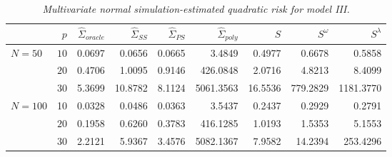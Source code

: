 %
%
\begin{table}[H]
\centering
\caption{\textit{Multivariate normal simulation-estimated quadratic risk  for model III.} }
\begin{tabular}{lrrrrrrrr}
  & $p$ &$\hat{\Sigma}_{oracle}$& $\hat{\Sigma}_{SS}$& $\hat{\Sigma}_{PS}$ & $\hat{\Sigma}_{poly}$ & $S$ &$S^\omega$& $S^\lambda$ \\ 
  \hline
$N = 50$ & $10$ & 0.0697 &0.0656 & 0.0665 &  3.4849 & 0.4977 & 0.6678 & 0.5858 \\ 
    &    $20$ & 0.4706 &1.0095 & 0.9146 &  426.0848 & 2.0716 & 4.8213 & 8.4099 \\ 
    &    $30$ & 5.3699 & 10.8782 & 8.1124 &  5061.3563 & 16.5536 & 779.2829 & 1181.3770 \\ 
     $N = 100$ & 10 & 0.0328 & 0.0486 & 0.0363 &  3.5437 & 0.2437 & 0.2929 & 0.2791 \\ 
     & $20$ &0.1958 & 0.6260 & 0.3783 &  416.1285 & 1.0193 & 1.5353 & 5.1553 \\ 
     & $30$ &2.2121 & 5.9367 & 3.4576 &  5082.1367 & 7.9582 & 14.2394 & 253.4296 \\ 
       \hline
\end{tabular}
\label{table:simulation-1-quad-loss-sigma-3}
\end{table}

